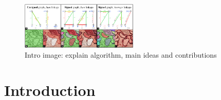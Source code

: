 
\begin{figure}
\centering
\includegraphics[width=0.50\textwidth,trim=0.4in 1.2in 0.in 0.05in,clip]{./figs/intro_image.pdf} %
\caption{\small 
Intro image: explain algorithm, main ideas and contributions
\label{fig:intro_figure}}
\end{figure}


\section{Introduction}


